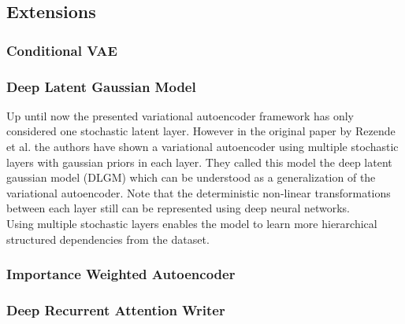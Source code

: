 
\newpage

\subsection{Extensions}
\label{sub:vae_extensions}

\subsubsection{Conditional VAE}
\label{ssub:cvae}


\newpage

\subsubsection{Deep Latent Gaussian Model}
Up until now the presented variational autoencoder framework has only considered one stochastic latent layer. However in the original paper by Rezende et al. \cite{dlgm:2014} the authors have shown a variational autoencoder using multiple stochastic layers with gaussian priors in each layer.
They called this model the deep latent gaussian model (DLGM) which can be understood as a generalization of the variational autoencoder.
Note that the deterministic non-linear transformations between each layer still can be represented using deep neural networks.\\
Using multiple stochastic layers enables the model to learn more hierarchical structured dependencies from the dataset.






\subsubsection{Importance Weighted Autoencoder}
\label{ssub:vae_importance_weighted_autoencoder}


\subsubsection{Deep Recurrent Attention Writer}
\label{ssub:vae_deep_recurrent_attention_writer}


\newpage
